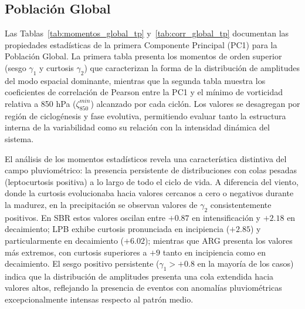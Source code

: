 % 
\subsection{Población Global}\label{subsubsec:pc1_global_tp}




Las Tablas~\ref{tab:momentos_global_tp} y~\ref{tab:corr_global_tp} documentan las propiedades estadísticas de la primera Componente Principal (PC1) para la Población Global. La primera tabla presenta los momentos de orden superior (sesgo $\gamma_1$ y curtosis $\gamma_2$) que caracterizan la forma de la distribución de amplitudes del modo espacial dominante, mientras que la segunda tabla muestra los coeficientes de correlación de Pearson entre la PC1 y el mínimo de vorticidad relativa a 850 hPa ($\zeta_{850}^{min}$) alcanzado por cada ciclón. Los valores se desagregan por región de ciclogénesis y fase evolutiva, permitiendo evaluar tanto la estructura interna de la variabilidad como su relación con la intensidad dinámica del sistema.

El análisis de los momentos estadísticos revela una característica distintiva del campo pluviométrico: la presencia persistente de distribuciones con colas pesadas (leptocurtosis positiva) a lo largo de todo el ciclo de vida. A diferencia del viento, donde la curtosis evolucionaba hacia valores cercanos a cero o negativos durante la madurez, en la precipitación se observan valores de $\gamma_2$ consistentemente positivos. En SBR estos valores oscilan entre $+0.87$ en intensificación y $+2.18$ en decaimiento; LPB exhibe curtosis pronunciada en incipiencia ($+2.85$) y particularmente en decaimiento ($+6.02$); mientras que ARG presenta los valores más extremos, con curtosis superiores a $+9$ tanto en incipiencia como en decaimiento. El sesgo positivo persistente ($\gamma_1 > +0.8$ en la mayoría de los casos) indica que la distribución de amplitudes presenta una cola extendida hacia valores altos, reflejando la presencia de eventos con anomalías pluviométricas excepcionalmente intensas respecto al patrón medio.

